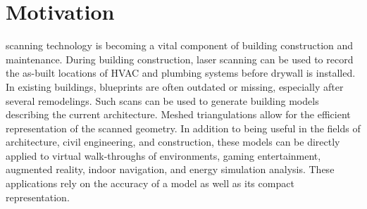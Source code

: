 \documentclass[journal]{IEEEtran}
\begin{document}
\section{Motivation}
\label{sec:introduction}

 scanning technology is becoming a vital component of building construction and maintenance.  During building construction, laser scanning can be used to record the as-built locations of HVAC and plumbing systems before drywall is installed.  In existing buildings, blueprints are often outdated or missing, especially after several remodelings.  Such scans can be used to generate building models describing the current architecture.  Meshed triangulations allow for the efficient representation of the scanned geometry.  In addition to being useful in the fields of architecture, civil engineering, and construction, these models can be directly applied to virtual walk-throughs of environments, gaming entertainment, augmented reality, indoor navigation, and energy simulation analysis.  These applications rely on the accuracy of a model as well as its compact representation.
\end{document}
